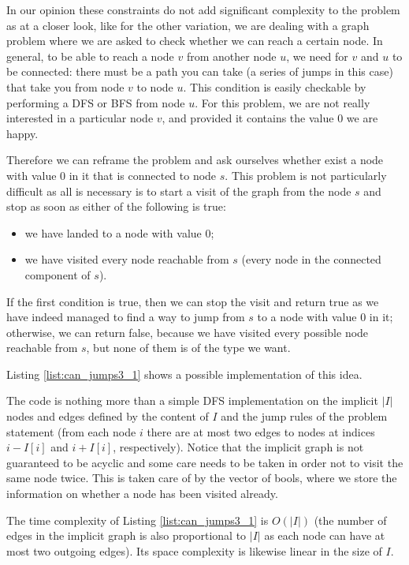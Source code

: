 In our opinion these constraints do not add significant complexity to the problem as at a closer look, like for the other variation, we are dealing with a graph problem where we are asked to check whether we can reach a certain node.
In general, to be able to reach a node $v$ from another node $u$, we need for $v$ and $u$ to be connected: there must be a path you can take (a series of jumps in this case) that take you from node $v$ to node $u$.
This condition is easily checkable by performing a DFS or BFS from node $u$.
For this problem, we are not really interested in a particular node $v$, and provided it contains the value $0$ we are happy.

Therefore we can reframe the problem and ask ourselves whether exist a node with value $0$ in it that is connected to node $s$. 
This problem is not particularly difficult as all is necessary is to start a visit of the graph from the node $s$ and stop as soon as either of the following is true:
\begin{itemize}
    \item we have landed to a node with value $0$;
    \item we have visited every node reachable from $s$ (every node in the connected component of $s$).
\end{itemize}
If the first condition is true, then we can stop the visit and return true as we have indeed managed to find a way to jump from $s$ to a node with value $0$ in it; otherwise, we can return false, because we have visited every possible node reachable from $s$, but none of them is of the type we want.

Listing \ref{list:can_jumps3_1} shows a possible implementation of this idea.



The code is nothing more than a simple DFS implementation on the implicit $|I|$ nodes and edges defined by the content of $I$ and the jump rules of the problem statement (from each node $i$ there are at most two edges to nodes at indices $i-I[i]$ and $i+I[i]$, respectively).
Notice that the implicit graph is not guaranteed to be acyclic and some care needs to be taken in order not to visit the same node twice. This is taken care of by the  vector of bools, where we store the information on whether a node has been visited already.

The time complexity of Listing \ref{list:can_jumps3_1} is $O(|I|)$ (the number of edges in the implicit graph is also proportional to $|I|$ as each node can have at most two outgoing edges). Its space complexity is likewise linear in the size of $I$.

